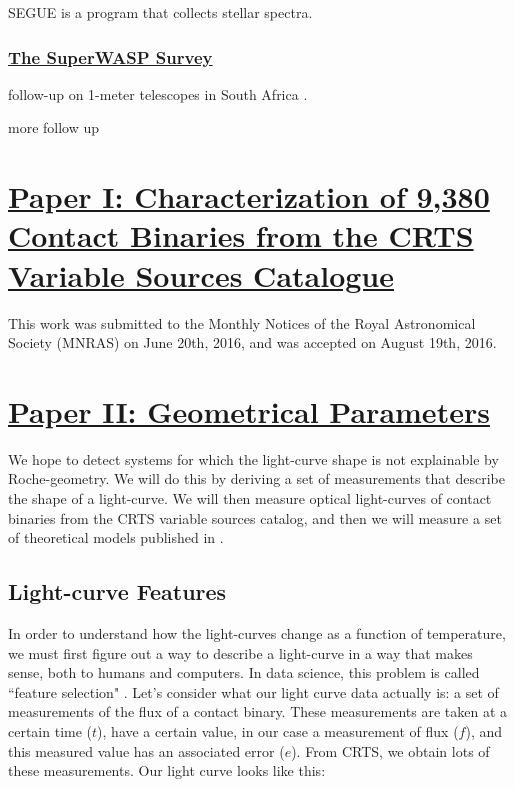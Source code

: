\documentclass[12pt]{article} %
\numberwithin{equation}{section} %
\begin{document}
SEGUE is a program that collects stellar spectra.

\subsubsection[The SuperWASP Survey]{\hyperlink{toc}{The SuperWASP Survey}}

follow-up on 1-meter telescopes in South Africa \citep{koen2016multi}.

more follow up \citep{darwish2016orbital}

\section[Paper I: Characterization of 9,380 Contact Binaries from the CRTS Variable Sources Catalogue]{\hyperlink{toc}{Paper I: Characterization of 9,380 Contact Binaries from the CRTS Variable Sources Catalogue}} \label{sec: Paper I: Introduction to the CRTS Data}

This work was submitted to the Monthly Notices of the Royal Astronomical Society (MNRAS) on June 20th, 2016, and was accepted on August 19th, 2016.



\section[Paper II: Geometrical Parameters]{\hyperlink{toc}{Paper II: Geometrical Parameters}} \label{sec: Paper II: Geometrical Parameters}

We hope to detect systems for which the light-curve shape is not explainable by Roche-geometry. We will do this by deriving a set of measurements that describe the shape of a light-curve. We will then measure optical light-curves of contact binaries from the CRTS variable sources catalog, and then we will measure a set of theoretical models published in \citet{rucinski1993light}. 

\subsection[Light-curve Features]{Light-curve Features} \label{sec: Light-curve Features}

In order to understand how the light-curves change as a function of temperature, we must first figure out a way to describe a light-curve in a way that makes sense, both to humans and computers. In data science, this problem is called ``feature selection" . Let's consider what our light curve data actually is: a set of measurements of the flux of a contact binary. These measurements are taken at a certain time ($t$), have a certain value, in our case a measurement of flux ($f$), and this measured value has an associated error ($e$). From CRTS, we obtain lots of these measurements. Our light curve looks like this:
\end{document}
